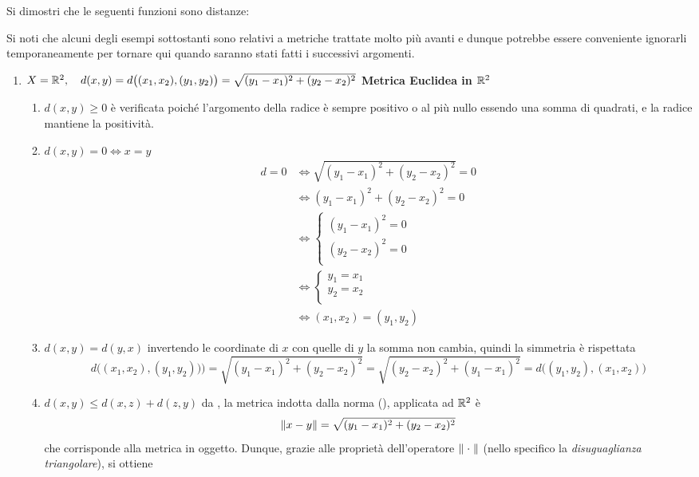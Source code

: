 \begin{example}
	\label{ex:metriche}
	Si dimostri che le seguenti funzioni sono distanze:
	\begin{note}
		Si noti che alcuni degli esempi sottostanti sono relativi a metriche trattate molto più avanti e dunque potrebbe essere conveniente ignorarli temporaneamente per tornare qui quando saranno stati fatti i successivi argomenti.
	\end{note}
	\begin{enumerate}
		\item $X=\mathbb{R}^2,\quad d(x,y) = d\bigl((x_1,x_2),(y_1,y_2)\bigr) = \sqrt{(y_1-x_1)^2+(y_2-x_2)^2}$ \hfill {\footnotesize\textbf{Metrica Euclidea in $\mathbb{R}^2$}}
			\begin{enumerate}[label=\arabic*]
				\item $d(x,y) \geq 0$ è verificata poiché l'argomento della radice è sempre positivo o al più nullo essendo una somma di quadrati, e la radice mantiene la positività.
				\item $d(x,y) = 0 \iff x = y$
					\begin{align*}
						d = 0 &\iff \sqrt{(y_1-x_1)^2+(y_2-x_2)^2} = 0\\
						&\iff (y_1-x_1)^2+(y_2-x_2)^2 = 0\\
						&\iff \begin{cases}
							(y_1-x_1)^2=0\\
							(y_2-x_2)^2=0\\
						\end{cases}\\
						&\iff
						\begin{cases}
							y_1=x_1\\
							y_2=x_2\\
						\end{cases}\\
						&\iff (x_1,x_2)=(y_1,y_2)
					\end{align*}
				\item $d(x,y) = d(y,x)$ invertendo le coordinate di $x$ con quelle di $y$ la somma non cambia, quindi la simmetria è rispettata
					$$d\bigl((x_1,x_2),(y_1,y_2)\bigr) \bigr) = \sqrt{(y_1-x_1)^2+(y_2-x_2)^2} = \sqrt{(y_2-x_2)^2+(y_1-x_1)^2} = d\bigl((y_1,y_2),(x_1,x_2)\bigr)$$
				\item $d(x,y) \leq d(x,z) + d(z,y)$ da , la metrica indotta dalla norma (), applicata ad $\mathbb{R}^2$ è
					$$\left\|x - y\right\| = \sqrt{(y_1-x_1)^2+(y_2-x_2)^2}$$
					che corrisponde alla metrica in oggetto. Dunque, grazie alle proprietà dell'operatore $\left\|\;\cdot\;\right\|$ (nello specifico la \textit{disuguaglianza triangolare}), si ottiene

\end{enumerate}
\end{enumerate}
\end{example}
